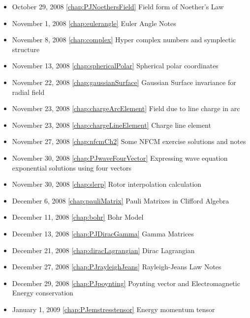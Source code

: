 \begin{itemize}
\item October 29, 2008 \ref{chap:PJNoethersField} Field form of Noether's Law

\item November 1, 2008 \ref{chap:eulerangle} Euler Angle Notes

\item November 8, 2008 \ref{chap:complex} Hyper complex numbers and symplectic structure

\item November 13, 2008 \ref{chap:sphericalPolar} Spherical polar coordinates

\item November 22, 2008 \ref{chap:gaussianSurface} Gaussian Surface invariance for radial field

\item November 23, 2008 \ref{chap:chargeArcElement} Field due to line charge in arc

\item November 23, 2008 \ref{chap:chargeLineElement} Charge line element

\item November 27, 2008 \ref{chap:nfcmCh2} Some NFCM exercise solutions and notes

\item November 30, 2008 \ref{chap:PJwaveFourVector} Expressing wave equation exponential solutions using four vectors

\item November 30, 2008 \ref{chap:slerp} Rotor interpolation calculation

\item December 6, 2008 \ref{chap:pauliMatrix} Pauli Matrixes in Clifford Algebra

\item December 11, 2008 \ref{chap:bohr} Bohr Model

\item December 13, 2008 \ref{chap:PJDiracGamma} Gamma Matrices

\item December 21, 2008 \ref{chap:diracLagrangian} Dirac Lagrangian

\item December 27, 2008 \ref{chap:PJrayleighJeans} Rayleigh-Jeans Law Notes

\item December 29, 2008 \ref{chap:PJpoynting} Poynting vector and Electromagnetic Energy conservation

\item January 1, 2009 \ref{chap:PJemstresstensor} Energy momentum tensor


\end{itemize}

